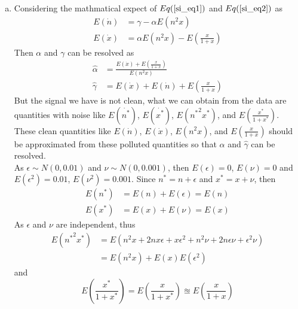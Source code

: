 \documentclass[paper=a4, fontsize=11pt]{scrartcl} %
\numberwithin{equation}{section} %
\numberwithin{figure}{section} %
\numberwithin{table}{section} %
\begin{document}
\begin{enumerate}[(a)]
		\item 
			Considering the mathmatical expect of $Eq(\ref{si_eq1})$ and $Eq(\ref{si_eq2})$ as
			\begin{equation}
				\begin{aligned}
					E(\dot{n}) & = \gamma - \alpha E(n^2 x)\\
					E(\dot{x}) & = \alpha E(n^2 x) - E(\frac{x}{1+x})
				\end{aligned}
			\end{equation}
			Then $\alpha$ and $\gamma$ can be resolved as
			\begin{equation}
				\begin{aligned}
					\hat{\alpha} & = \frac{E(\dot{x}) + E(\frac{x}{1+x})}{E(n^2 x)}\\
					\hat{\gamma} & = E(\dot{x}) + E(\dot{n}) + E(\frac{x}{1+x})
				\end{aligned}
			\end{equation}
			But the signal we have is not clean, what we can obtain from the data are quantities with noise like $E(\dot{n^*})$, $E(\dot{x^*})$, $E({n^*}^2 x^*)$, and $E(\frac{x^*}{1+x^*})$. These clean quantities like $E(\dot{n})$, $E(\dot{x})$, $E(n^2 x)$, and $E(\frac{x}{1+x})$ should be approximated from these polluted quantities so that $\hat{\alpha}$ and $\hat{\gamma}$ can be resolved.\\
			As $\epsilon \sim N(0, 0.01)$ and $\nu \sim N(0, 0.001)$, then $E(\epsilon) = 0$, $E(\nu) = 0$ and $E(\epsilon^2) = 0.01$, $E(\nu^2)=0.001$.
			Since $n^* = n + \epsilon$ and $x^* = x + \nu$, then
			\begin{equation}
				\begin{aligned}
					E(n^*) & = E(n) + E(\epsilon) = E(n)\\
					E(x^*) & = E(x) + E(\nu) = E(x)
				\end{aligned}
			\end{equation}
			As $\epsilon$ and $\nu$ are independent, thus
			\begin{equation}
				\begin{aligned}
					E({n^*}^2 x^*) & = E(n^2 x + 2nx\epsilon + x\epsilon^2 + n^2\nu + 2n\epsilon\nu + \epsilon^2 \nu)\\
					               & = E(n^2 x) + E(x)E(\epsilon^2)
				\end{aligned}
			\end{equation}
			and
			\begin{equation}
				E(\frac{x^*}{1+x^*}) = E(\frac{x}{1+x^*}) \approxeq E(\frac{x}{1+x})
			\end{equation}

\end{enumerate}
\end{document}
